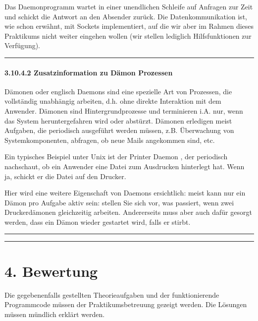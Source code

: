 \documentclass[a4paper,10pt,english]{report}
\begin{document}
\sphinxAtStartPar
{}

\sphinxAtStartPar
Das Daemonprogramm wartet in einer unendlichen Schleife auf Anfragen zur Zeit und schickt die Antwort an den Absender zurück. Die Datenkommunikation ist, wie schon erwähnt, mit Sockets implementiert, auf die wir aber im Rahmen dieses Praktikums nicht weiter eingehen wollen (wir stellen lediglich Hilfsfunktionen zur Verfügung).


\bigskip\hrule\bigskip



\paragraph{3.10.4.2	Zusatzinformation zu Dämon Prozessen}
\label{\detokenize{P07_Prozesse_und_Threads/README:zusatzinformation-zu-damon-prozessen}}
\sphinxAtStartPar
Dämonen oder englisch Daemons sind eine spezielle Art von Prozessen, die vollständig unabhängig arbeiten, d.h. ohne direkte Interaktion mit dem Anwender. Dämonen sind Hintergrundprozesse und terminieren i.A. nur, wenn das System heruntergefahren wird oder abstürzt. Dämonen erledigen meist Aufgaben, die periodisch ausgeführt werden müssen, z.B. Überwachung von Systemkomponenten, abfragen, ob neue Mails angekommen sind, etc.

\sphinxAtStartPar
Ein typisches Beispiel unter Unix ist der Printer Daemon , der periodisch nachschaut, ob ein Anwender eine Datei zum Ausdrucken hinterlegt hat. Wenn ja, schickt er die Datei auf den Drucker.

\sphinxAtStartPar
Hier wird eine weitere Eigenschaft von Daemons ersichtlich: meist kann nur ein Dämon pro Aufgabe aktiv sein: stellen Sie sich vor, was passiert, wenn zwei Druckerdämonen gleichzeitig arbeiten. Andererseits muss aber auch dafür gesorgt werden, dass ein Dämon wieder gestartet wird, falls er stirbt.


\bigskip\hrule\bigskip



\bigskip\hrule\bigskip



\section{4. Bewertung}
\label{\detokenize{P07_Prozesse_und_Threads/README:bewertung}}
\sphinxAtStartPar
Die gegebenenfalls gestellten Theorieaufgaben und der funktionierende Programmcode müssen der Praktikumsbetreuung gezeigt werden. Die Lösungen müssen mündlich erklärt werden.
\end{document}
